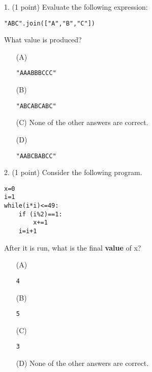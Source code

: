 \documentclass{article}
\begin{document}
\newpage





\noindent
\begin{minipage}{\textwidth}
1. (1 point)
Evaluate the following expression:
\begin{verbatim}
"ABC".join(["A","B","C"])
\end{verbatim}
What value is produced?

\begin{enumerate}
\item[(A)]
\begin{verbatim}"AAABBBCCC"\end{verbatim}

\item[(B)]
\begin{verbatim}"ABCABCABC"\end{verbatim}

\item[(C)]
None of the other answers are correct.

\item[(D)]
\begin{verbatim}"AABCBABCC"\end{verbatim}

\end{enumerate}
\end{minipage}
\vspace{10em}
\filbreak\vfil{}\vfilneg

\noindent
\begin{minipage}{\textwidth}
2. (1 point)
Consider the following program.
\begin{verbatim}
x=0
i=1
while(i*i)<=49:
    if (i%2)==1:
        x+=1
    i=i+1
\end{verbatim}
After it is run, what is the final \textbf{value} of x?

\begin{enumerate}
\item[(A)]
\begin{verbatim}4\end{verbatim}

\item[(B)]
\begin{verbatim}5\end{verbatim}

\item[(C)]
\begin{verbatim}3\end{verbatim}

\item[(D)]
None of the other answers are correct.

\end{enumerate}
\end{minipage}
\vspace{10em}
\filbreak\vfil{}\vfilneg
\end{document}
